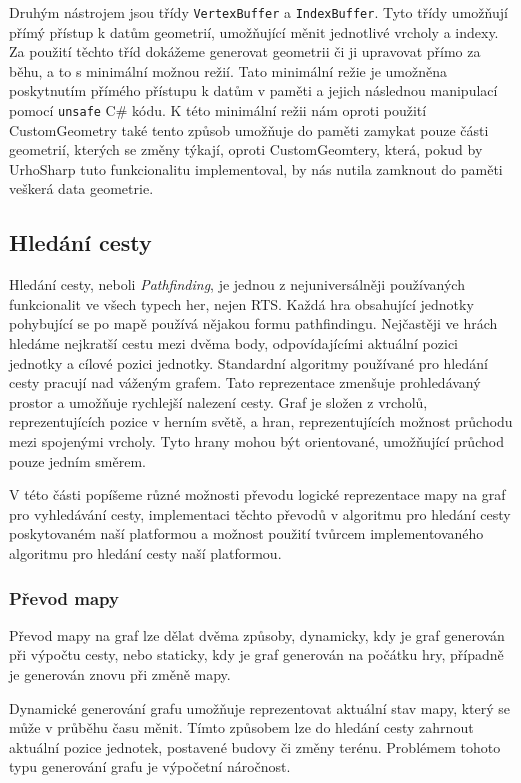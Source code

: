Druhým nástrojem jsou třídy \texttt{VertexBuffer} a \texttt{IndexBuffer}. Tyto třídy umožňují přímý přístup k datům geometrií, umožňující měnit jednotlivé vrcholy a indexy. Za použití těchto tříd dokážeme generovat geometrii či ji upravovat přímo za běhu, a to s minimální možnou režií. Tato minimální režie je umožněna poskytnutím přímého přístupu k datům v paměti a jejich následnou manipulací pomocí \texttt{unsafe} C\# kódu. K této minimální režii nám oproti použití CustomGeometry také tento způsob umožňuje do paměti zamykat pouze části geometrií, kterých se změny týkají, oproti CustomGeomtery, která, pokud by UrhoSharp tuto funkcionalitu implementoval, by nás nutila zamknout do paměti veškerá data geometrie.


\subsection{Hledání cesty}
Hledání cesty, neboli \textit{Pathfinding}, je jednou z nejuniversálněji používaných funkcionalit ve všech typech her, nejen RTS. Každá hra obsahující jednotky pohybující se po mapě používá nějakou formu pathfindingu. Nejčastěji ve hrách hledáme nejkratší cestu mezi dvěma body, odpovídajícími aktuální pozici jednotky a cílové pozici jednotky. Standardní algoritmy používané pro hledání cesty pracují nad váženým grafem. Tato reprezentace zmenšuje prohledávaný prostor a umožňuje rychlejší nalezení cesty. Graf je složen z vrcholů, reprezentujících pozice v herním světě, a hran, reprezentujících možnost průchodu mezi spojenými vrcholy. Tyto hrany mohou být orientované, umožňující průchod pouze jedním směrem.

V této části popíšeme různé možnosti převodu logické reprezentace mapy na graf pro vyhledávání cesty, implementaci těchto převodů v algoritmu pro hledání cesty poskytovaném naší platformou a možnost použití tvůrcem implementovaného algoritmu pro hledání cesty naší platformou.


\subsubsection{Převod mapy}
Převod mapy na graf lze dělat dvěma způsoby, dynamicky, kdy je graf generován při výpočtu cesty, nebo staticky, kdy je graf generován na počátku hry, případně je generován znovu při změně mapy.

Dynamické generování grafu umožňuje reprezentovat aktuální stav mapy, který se může v průběhu času měnit. Tímto způsobem lze do hledání cesty zahrnout aktuální pozice jednotek, postavené budovy či změny terénu. Problémem tohoto typu generování grafu je výpočetní náročnost.


